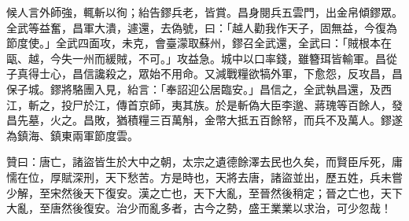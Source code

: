 \begin{pinyinscope}
 候人言外師強，輒斬以徇；紿告鏐兵老，皆賞。昌身閱兵五雲門，出金帛傾鏐眾。全武等益奮，昌軍大潰，遽還，去偽號，曰：「越人勸我作天子，固無益，今復為節度使。」全武四面攻，未克，會臺濛取蘇州，鏐召全武還，全武曰：「賊根本在甌、越，今失一州而緩賊，不可。」攻益急。城中以口率錢，雖簪珥皆輸軍。昌從子真得士心，昌信讒殺之，眾始不用命。又減戰糧欲犒外軍，下愈怨，反攻昌，昌保子城。鏐將駱團入見，紿言：「奉詔迎公居臨安。」昌信之，全武執昌還，及西江，斬之，投尸於江，傳首京師，夷其族。於是斬偽大臣李邈、蔣瑰等百餘人，發昌先墓，火之。昌敗，猶積糧三百萬斛，金幣大抵五百餘帑，而兵不及萬人。鏐遂為鎮海、鎮東兩軍節度雲。



 贊曰：唐亡，諸盜皆生於大中之朝，太宗之遺德餘澤去民也久矣，而賢臣斥死，庸懦在位，厚賦深刑，天下愁苦。方是時也，天將去唐，諸盜並出，歷五姓，兵未嘗少解，至宋然後天下復安。漢之亡也，天下大亂，至晉然後稍定；晉之亡也，天下大亂，至唐然後復安。治少而亂多者，古今之勢，盛王業業以求治，可少忽哉！



\end{pinyinscope}